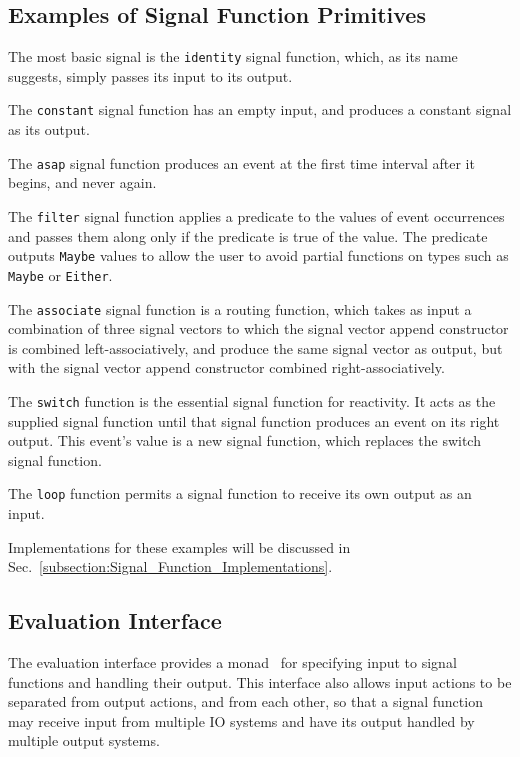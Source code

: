 \documentclass[draft]{llncs}
\begin{document}
\subsection{Examples of Signal Function Primitives}
\label{subsection:Examples_of_Signal_Function_Primitives}
The most basic signal is the {\tt identity} signal function, which, as its
name suggests, simply passes its input to its output.

The {\tt constant} signal function has an empty input, and produces a constant
signal as its output.

The {\tt asap} signal function produces an event at the first time interval
after it begins, and never again.

The {\tt filter} signal function applies a predicate to the values of event
occurrences and passes them along only if the predicate is true of the value.
The predicate outputs {\tt Maybe} values to allow the user to avoid partial
functions on types such as {\tt Maybe} or {\tt Either}.

The {\tt associate} signal function is a routing function, which takes as input
a combination of three signal vectors to which the signal vector append
constructor is combined left-associatively, and produce the same signal vector
as output, but with the signal vector append constructor combined
right-associatively.

The {\tt switch} function is the essential signal function for reactivity. It
acts as the supplied signal function until that signal function produces an
event on its right output. This event's value is a new signal function, which
replaces the switch signal function.

The {\tt loop} function permits a signal function to receive its own output
as an input.

Implementations for these examples will be discussed in Sec.~\ref{subsection:Signal_Function_Implementations}.


\subsection{Evaluation Interface}
The evaluation interface provides a monad~\cite{PeytonJones1993,PeytonJones2001}
for specifying input to signal functions and handling their output. This
interface also allows input actions to be separated from output actions, and
from each other, so that a signal function may receive input from multiple IO
systems and have its output handled by multiple output systems.
\end{document}
